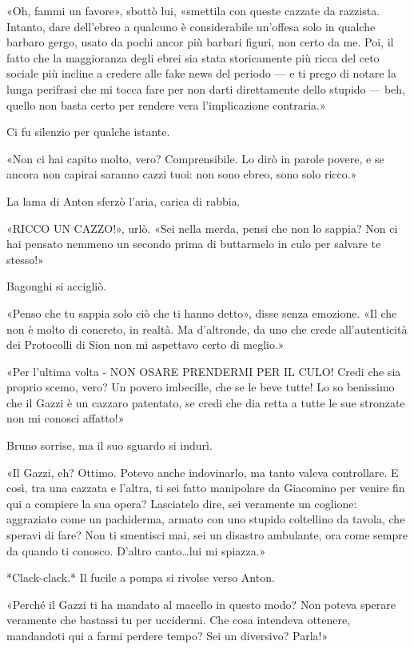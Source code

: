«Oh, fammi un favore», sbottò lui, «smettila con queste cazzate da razzista. Intanto, dare dell'ebreo a qualcuno è considerabile un'offesa solo in qualche barbaro gergo, usato da pochi ancor più barbari figuri, non certo da me. Poi, il fatto che la maggioranza degli ebrei sia stata storicamente più ricca del ceto sociale più incline a credere alle fake news del periodo --- e ti prego di notare la lunga perifrasi che mi tocca fare per non darti direttamente dello stupido --- beh, quello non basta certo per rendere vera l'implicazione contraria.»

Ci fu silenzio per qualche istante.

«Non ci hai capito molto, vero? Comprensibile. Lo dirò in parole povere, e se ancora non capirai saranno cazzi tuoi: non sono ebreo, sono solo ricco.»

La lama di Anton sferzò l'aria, carica di rabbia.

«RICCO UN CAZZO!», urlò. «Sei nella merda, pensi che non lo sappia? Non ci hai pensato nemmeno un secondo prima di buttarmelo in culo per salvare te stesso!»

Bagonghi si accigliò.

«Penso che tu sappia solo ciò che ti hanno detto», disse senza emozione. «Il che non è molto di concreto, in realtà. Ma d'altronde, da uno che crede all'autenticità dei Protocolli di Sion non mi aspettavo certo di meglio.»

«Per l'ultima volta - NON OSARE PRENDERMI PER IL CULO! Credi che sia proprio scemo, vero? Un povero imbecille, che se le beve tutte! Lo so benissimo che il Gazzi è un cazzaro patentato, se credi che dia retta a tutte le sue stronzate non mi conosci affatto!»

Bruno sorrise, ma il suo sguardo si indurì.

«Il Gazzi, eh? Ottimo. Potevo anche indovinarlo, ma tanto valeva controllare. E così, tra una cazzata e l'altra, ti sei fatto manipolare da Giacomino per venire fin qui a compiere la sua opera? Lasciatelo dire, sei veramente un coglione: aggraziato come un pachiderma, armato con uno stupido coltellino da tavola, che speravi di fare? Non ti smentisci mai, sei un disastro ambulante, ora come sempre da quando ti conosco. D'altro canto\ldots lui mi spiazza.»

*Clack-clack.* Il fucile a pompa si rivolse verso Anton.

«Perché il Gazzi ti ha mandato al macello in questo modo? Non poteva sperare veramente che bastassi tu per uccidermi. Che cosa intendeva ottenere, mandandoti qui a farmi perdere tempo? Sei un diversivo? Parla!»

